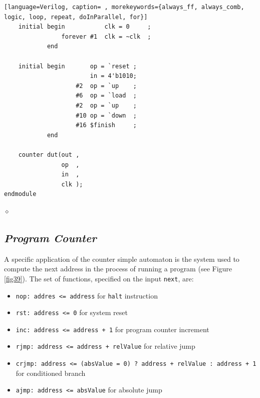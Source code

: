 \begin{exemplu}
{{\begin{shaded*}
\begin{lstlisting}[language=Verilog, caption= , morekeywords={always_ff, always_comb, logic, loop, repeat, doInParallel, for}]
    initial begin           clk = 0     ;
                forever #1  clk = ~clk  ;
            end

    initial begin       op = `reset ;
                        in = 4'b1010;
                    #2  op = `up    ;
                    #6  op = `load  ;
                    #2  op = `up    ;
                    #10 op = `down  ;
                    #16 $finish     ;
            end

    counter dut(out ,
                op  ,
                in  ,
                clk );
endmodule
\end{lstlisting}
\end{shaded*}
}}

$\diamond$
\end{exemplu}

\subsection{{\bf {\em Program Counter}}}\label{progCounter}

A specific application of the counter simple automaton is the system used to compute the next address in the process of running a program (see Figure \ref{fig39}). The set of functions, specified on the input {\tt next}, are:
\begin{itemize}
    \item {\tt nop: addres <= address} for {\tt halt} instruction
    \item {\tt rst: address <= 0} for system reset
    \item {\tt inc: address <= address + 1} for program counter increment
    \item {\tt rjmp: address <= address + relValue} for relative jump
    \item {\tt crjmp: address <= (absValue = 0) ? address + relValue : address + 1} for conditioned branch
    \item {\tt ajmp: address <= absValue} for absolute jump
\end{itemize}





